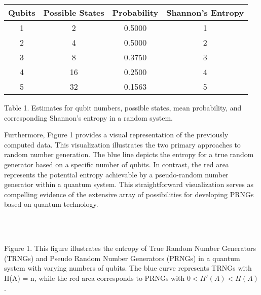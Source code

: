\documentclass[12pt]{article}
\begin{document}
	 		\begin{center}
	 			\begin{tabular}{ |c|c|c|c| } 
	 				\hline
	 				Qubits  & Possible States  & Probability & Shannon’s Entropy\\
	 				\hline
	 				1 & 2 & 0.5000 & 1 \\ 
	 				2 & 4 & 0.5000 & 2 \\ 
	 				3 & 8 & 0.3750 & 3 \\ 
	 				4 & 16 & 0.2500 & 4 \\ 
	 				5 & 32 & 0.1563 & 5 \\ 
	 				\hline
	 			\end{tabular}
	 		\end{center}
	   		{Table 1. Estimates for qubit numbers, possible states, mean probability, and corresponding Shannon’s entropy in a random
	   		system.\\\par
	   		Furthermore, Figure 1 provides a visual representation of the previously computed data. This visualization illustrates the
	   		two primary approaches to random number generation. The blue line depicts the entropy for a true random generator based on a
	   		specific number of qubits. In contrast, the red area represents the potential entropy achievable by a pseudo-random number
	   		generator within a quantum system. This straightforward visualization serves as compelling evidence of the extensive array of
	   		possibilities for developing PRNGs based on quantum technology.}\\
	   		
	   		
	   		\\
	   	 	{Figure 1. This figure illustrates the entropy of True Random Number Generators (TRNGs) and Pseudo Random Number
	   	 		Generators (PRNGs) in a quantum system with varying numbers of qubits. The blue curve represents TRNGs with H(A) = n,
	   	 		while the red area corresponds to PRNGs with $0 < H'(A) < H(A)$.}
	   	 	
	   		
	   	
   		
	   		
	   		
	
\end{document}
